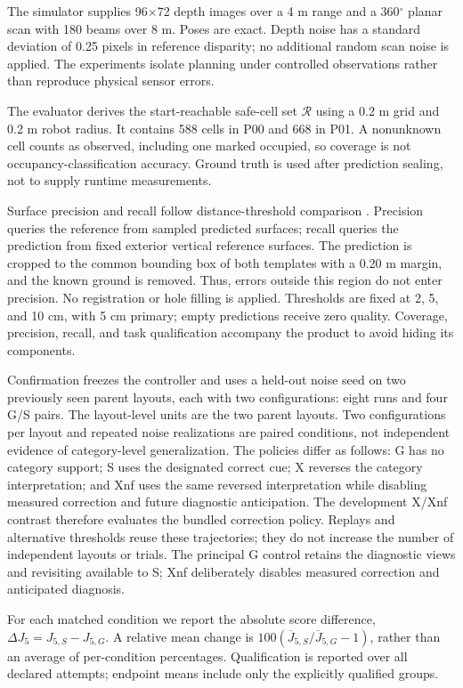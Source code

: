 \documentclass[11pt,a4paper]{article}
\begin{document}
The simulator supplies 96\ensuremath{\times}72 depth images over a 4 m range and a 360\ensuremath{^{\circ}} planar scan with 180 beams over 8 m. Poses are exact. Depth noise has a standard deviation of 0.25 pixels in reference disparity; no additional random scan noise is applied. The experiments isolate planning under controlled observations rather than reproduce physical sensor errors.

The evaluator derives the start-reachable safe-cell set \(\mathcal R\) using a 0.2 m grid and 0.2 m robot radius. It contains 588 cells in P00 and 668 in P01. A nonunknown cell counts as observed, including one marked occupied, so coverage is not occupancy-classification accuracy. Ground truth is used after prediction sealing, not to supply runtime measurements.

Surface precision and recall follow distance-threshold comparison \cite{ref14}. Precision queries the reference from sampled predicted surfaces; recall queries the prediction from fixed exterior vertical reference surfaces. The prediction is cropped to the common bounding box of both templates with a 0.20 m margin, and the known ground is removed. Thus, errors outside this region do not enter precision. No registration or hole filling is applied. Thresholds are fixed at 2, 5, and 10 cm, with 5 cm primary; empty predictions receive zero quality. Coverage, precision, recall, and task qualification accompany the product to avoid hiding its components.

Confirmation freezes the controller and uses a held-out noise seed on two previously seen parent layouts, each with two configurations: eight runs and four G/S pairs. The layout-level units are the two parent layouts. Two configurations per layout and repeated noise realizations are paired conditions, not independent evidence of category-level generalization. The policies differ as follows: G has no category support; S uses the designated correct cue; X reverses the category interpretation; and Xnf uses the same reversed interpretation while disabling measured correction and future diagnostic anticipation. The development X/Xnf contrast therefore evaluates the bundled correction policy. Replays and alternative thresholds reuse these trajectories; they do not increase the number of independent layouts or trials. The principal G control retains the diagnostic views and revisiting available to S; Xnf deliberately disables measured correction and anticipated diagnosis.

For each matched condition we report the absolute score difference, \(\Delta J_5=J_{5,S}-J_{5,G}\). A relative mean change is \(100(\overline J_{5,S}/\overline J_{5,G}-1)\), rather than an average of per-condition percentages. Qualification is reported over all declared attempts; endpoint means include only the explicitly qualified groups.
\end{document}

